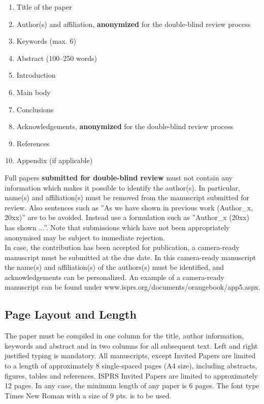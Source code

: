 \documentclass{isprs} %
\begin{document}
\begin{enumerate}
\setlength\itemsep{0em}\setlength\parskip{0em}\setlength\topsep{0em}\setlength\partopsep{0em}\setlength\parsep{0em} 
\item{Title of the paper} 
\item{Author(s) and affiliation, \textbf{anonymized} for the double-blind review process}
\item{Keywords (max. 6)}
\item{Abstract (100--250 words)}
\item{Introduction}
\item{Main body}
\item{Conclusions}
\item{Acknowledgements,  \textbf{anonymized} for the double-blind review process}
\item{References}
\item{Appendix (if applicable)}
\end{enumerate}

Full papers \textbf{submitted for double-blind review} must not contain any information which makes it possible to identify the author(s). In particular, name(s) and affiliation(s) must be removed from the manuscript submitted for review. Also sentences such as ''As we have shown in previous work (Author\_x, 20xx)'' are to be avoided. Instead use a formulation such as ''Author\_x (20xx) has shown ...''. Note that submissions which have not been appropriately anonymised may be subject to immediate rejection.\\

In case, the contribution has been accepted for publication, a camera-ready manuscript must be submitted at the due date. In this camera-ready manuscript the name(s) and affiliation(s) of the authors(s) must be identified, and acknowledgements can be personalized. An example of a camera-ready manuscript can be found under www.isprs.org/documents/orangebook/app5.aspx.

\subsection{Page Layout and Length}\label{sec:Page Layout, Spacing and Margins}
The paper must be compiled in one column for the title, author information, keywords and abstract and in two columns for all subsequent text. Left and right justified typing is mandatory. All manuscripts, except Invited Papers are limited to a length of approximately 8 single-spaced pages (A4 size), including abstracts, figures, tables and references. ISPRS Invited Papers are limited to approximately 12 pages. In any case, the minimum length of any paper is 6 pages. The font type Times New Roman with a size of 9 pts. is to be used.
\end{document}
